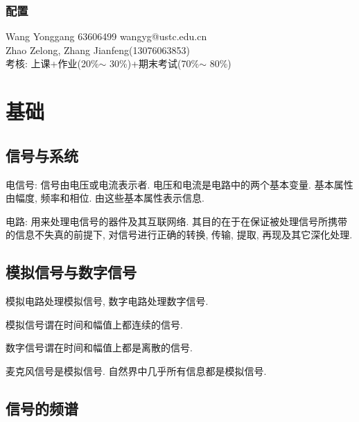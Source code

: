 \documentclass[hidelinks]{ctexart}
\begin{document}
\subsubsection*{配置} %
\label{ssub:配置}

\noindent
Wang Yonggang 63606499 wangyg@ustc.edu.cn\\
Zhao Zelong, Zhang Jianfeng(13076063853)\\
考核: 上课+作业(20\%$\sim$ 30\%)+期末考试(70\%$\sim$ 80\%)


\section{基础} %
\label{sec:基础}

\subsection{信号与系统} %
\label{sub:信号与系统}

电信号: 信号由电压或电流表示者. 电压和电流是电路中的两个基本变量. 基本属性由幅度, 频率和相位. 由这些基本属性表示信息.
\par
电路: 用来处理电信号的器件及其互联网络. 其目的在于在保证被处理信号所携带的信息不失真的前提下, 对信号进行正确的转换, 传输, 提取, 再现及其它深化处理.


\subsection{模拟信号与数字信号} %
\label{sub:模拟信号与数字信号}

模拟电路处理模拟信号, 数字电路处理数字信号.
\par
模拟信号谓在时间和幅值上都连续的信号.
\par
数字信号谓在时间和幅值上都是离散的信号.
\begin{ex}
    麦克风信号是模拟信号. 自然界中几乎所有信息都是模拟信号.
\end{ex}


\subsection{信号的频谱} %
\label{sub:信号的频谱}
\end{document}
